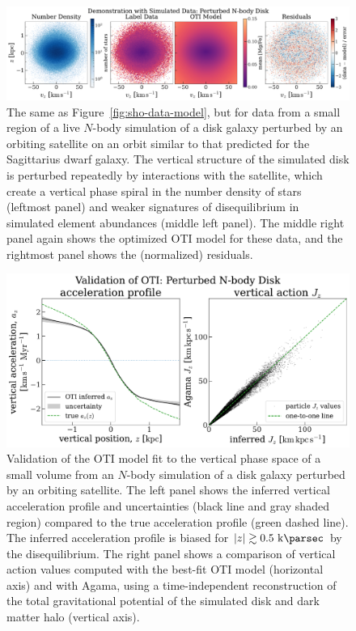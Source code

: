 \documentclass[modern]{aastex631}
\begin{document}
\begin{figure}[t!]
\begin{center}
\includegraphics[width=\textwidth]{jason-sim-data-model.pdf}
\end{center}
\caption{%
The same as Figure~\ref{fig:sho-data-model}, but for data from a small region of a live
$N$-body simulation of a disk galaxy perturbed by an orbiting satellite on an orbit
similar to that predicted for the Sagittarius dwarf galaxy.
The vertical structure of the simulated disk is perturbed repeatedly by interactions
with the satellite, which create a vertical phase spiral in the number density of stars
(leftmost panel) and weaker signatures of disequilibrium in simulated element abundances
(middle left panel).
The middle right panel again shows the optimized OTI model for these data, and the
rightmost panel shows the (normalized) residuals.
\label{fig:jason-data-model}
}
\end{figure}

\begin{figure}[t!]
\begin{center}
\includegraphics[width=\textwidth]{jason-sim-validation.pdf}
\end{center}
\caption{%
Validation of the OTI model fit to the vertical phase space of a small volume from an
$N$-body simulation of a disk galaxy perturbed by an orbiting satellite.
The left panel shows the inferred vertical acceleration profile and uncertainties (black
line and gray shaded region) compared to the true acceleration profile (green dashed
line).
The inferred acceleration profile is biased for $|z| \gtrsim 0.5~\kpc$ by the
disequilibrium.
The right panel shows a comparison of vertical action values computed with the best-fit
OTI model (horizontal axis) and with Agama, using a time-independent reconstruction of
the total gravitational potential of the simulated disk and dark matter halo (vertical
axis).
\label{fig:jason-validation}
}
\end{figure}
\end{document}
